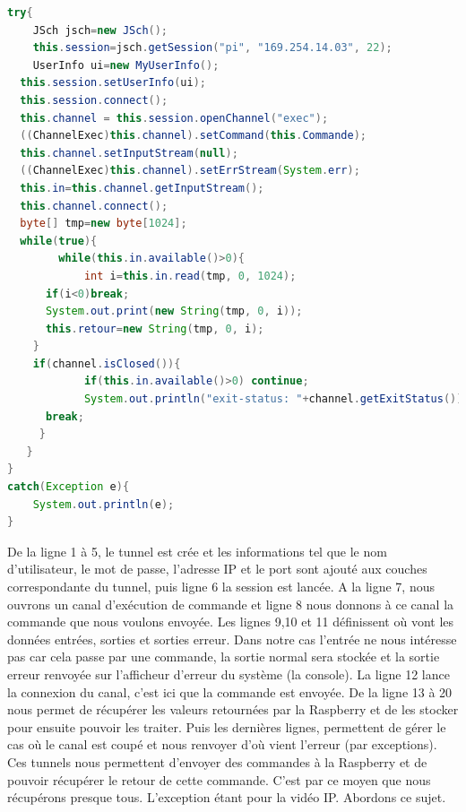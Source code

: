 \documentclass[a4paper,11pt]{report}
\begin{document}
			\begin{lstlisting}[language=java]
try{
	JSch jsch=new JSch();
	this.session=jsch.getSession("pi", "169.254.14.03", 22);
	UserInfo ui=new MyUserInfo();
  this.session.setUserInfo(ui);
  this.session.connect();
  this.channel = this.session.openChannel("exec");
  ((ChannelExec)this.channel).setCommand(this.Commande);
  this.channel.setInputStream(null);
  ((ChannelExec)this.channel).setErrStream(System.err);
  this.in=this.channel.getInputStream();
  this.channel.connect();
  byte[] tmp=new byte[1024];
  while(true){
		while(this.in.available()>0){
			int i=this.in.read(tmp, 0, 1024);
      if(i<0)break;
      System.out.print(new String(tmp, 0, i));
      this.retour=new String(tmp, 0, i);
    }
    if(channel.isClosed()){
			if(this.in.available()>0) continue; 
			System.out.println("exit-status: "+channel.getExitStatus());
      break;
     }
   }
}
catch(Exception e){
	System.out.println(e);
}
			\end{lstlisting}
			De la ligne 1 à 5, le tunnel est crée et les informations tel que le nom d'utilisateur, le mot de passe, l'adresse IP et le port sont ajouté aux couches correspondante du tunnel, puis ligne 6 la session est lancée.
		\newline A la ligne 7, nous ouvrons un canal d’exécution de commande et ligne 8 nous donnons à ce canal la commande que nous voulons envoyée.
		\newline Les lignes 9,10 et 11 définissent où vont les données entrées, sorties et sorties erreur. Dans notre cas l'entrée ne nous intéresse pas car cela passe par une commande, la sortie normal sera stockée et la sortie erreur renvoyée sur l'afficheur d'erreur du système (la console). La ligne 12 lance la connexion du canal, c'est ici que la commande est envoyée.
		\newline De la ligne 13 à 20 nous permet de récupérer les valeurs retournées par la Raspberry et de les stocker pour ensuite pouvoir les traiter.
		\newline Puis les dernières lignes, permettent de gérer le cas où le canal est coupé et nous renvoyer d'où vient l'erreur (par exceptions).
		\newline \newline Ces tunnels nous permettent d'envoyer des commandes à la Raspberry et de pouvoir récupérer le retour de cette commande. C'est par ce moyen que nous récupérons presque tous. L'exception étant pour la vidéo IP. Abordons ce sujet.
\end{document}
